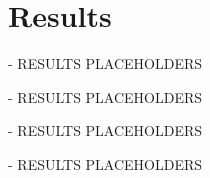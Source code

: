 \chapter{Results}\label{ch:results}


\begin{tcolorbox}[colback=orange]
- RESULTS PLACEHOLDERS
\vspace{20cm}

\end{tcolorbox}
\begin{tcolorbox}[colback=orange]
- RESULTS PLACEHOLDERS
\vspace{20cm}

\end{tcolorbox}
\begin{tcolorbox}[colback=orange]
- RESULTS PLACEHOLDERS
\vspace{20cm}

\end{tcolorbox}
\begin{tcolorbox}[colback=orange]
- RESULTS PLACEHOLDERS
\vspace{20cm}

\end{tcolorbox}
